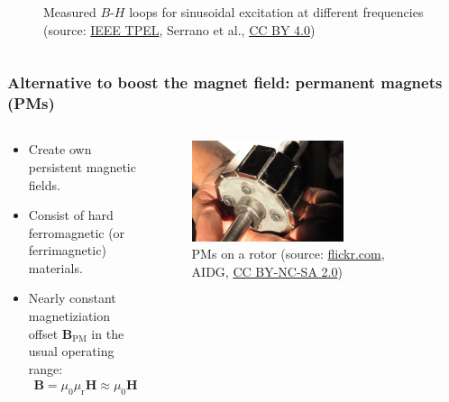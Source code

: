 \begin{frame}
\begin{columns}
\begin{column}{0.475\textwidth}
\begin{figure}
				\caption{Measured $B$-$H$ loops for sinusoidal excitation at different frequencies (source: \href{https://ieeexplore.ieee.org/abstract/document/10169101}{IEEE TPEL}, Serrano et al., \href{https://creativecommons.org/licenses/by/4.0/}{CC BY 4.0})}
			\end{figure}
		\end{column}
		\end{columns}
\end{frame}

\begin{frame}
	\frametitle{Alternative to boost the magnet field: permanent magnets (PMs)}
    \begin{columns}
        \begin{column}{0.48\textwidth}
        \begin{itemize}
            \item Create own persistent magnetic fields.
            \item Consist of hard ferromagnetic (or ferrimagnetic) materials.
            \item Nearly constant magnetiziation offset $\bm{B}_\mathrm{PM}$ in the usual operating range:
            \begin{align}
                \bm{B} = \mu_0 \mu_{\mathrm{r}} \bm{H} \approx \mu_0 \bm{H} + \bm{B}_\mathrm{PM}.
            \end{align}
        \end{itemize}
        \end{column}
        \hfill
        \begin{column}{0.4\textwidth}
            \begin{figure}
                \centering
                \includegraphics[width=0.65\textwidth]{fig/lec02/PM_rotor_example.jpg}
                \caption{PMs on a rotor (source: \href{https://www.flickr.com/photos/aidg/2382339376}{flickr.com}, AIDG, \href{https://creativecommons.org/licenses/by-nc-sa/2.0/}{CC BY-NC-SA 2.0})}

\end{figure}
\end{column}
\end{columns}
\end{frame}
